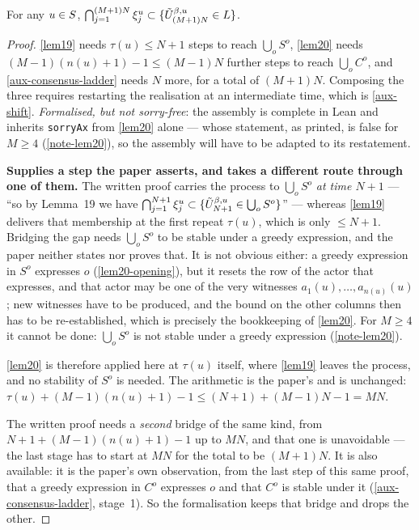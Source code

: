 \begin{proposition}
  \label{prop7}
  \leanok
  For any $u \in S$,
  $\bigcap_{j=1}^{(M+1)N} \xi_j^u \subset \{ \tilde{U}^{\beta,u}_{(M+1)N} \in L \}$.
\end{proposition}
\begin{proof}
  \leanok
  \ref{lem19} needs $\tau(u) \le N+1$ steps to reach $\bigcup_o S^o$,
  \ref{lem20} needs $(M-1)(n(u)+1)-1 \le (M-1)N$ further steps to reach
  $\bigcup_o C^o$, and \ref{aux-consensus-ladder} needs $N$ more, for a total
  of $(M+1)N$.  Composing the three requires restarting the realisation at an
  intermediate time, which is \ref{aux-shift}. \emph{Formalised, but not
  sorry-free}: the assembly is complete in Lean and inherits \texttt{sorryAx}
  from \ref{lem20} alone --- whose statement, as printed, is false for $M \ge
  4$ (\ref{note-lem20}), so the assembly will have to be adapted to its
  restatement.

  \textbf{Supplies a step the paper asserts, and takes a different route
  through one of them.} The written proof carries the process to $\bigcup_o
  S^o$ \emph{at time $N+1$} --- ``so by Lemma~19 we have
  $\bigcap_{j=1}^{N+1}\xi_j^u \subset \{\tilde{U}^{\beta,u}_{N+1} \in \bigcup_o S^o\}$''
  --- whereas \ref{lem19} delivers that membership at the first repeat
  $\tau(u)$, which is only $\le N+1$.  Bridging the gap needs $\bigcup_o S^o$
  to be stable under a greedy expression, and the paper neither states nor
  proves that.  It is not obvious either: a greedy expression in $S^o$
  expresses $o$ (\ref{lem20-opening}), but it resets the row of the actor that
  expresses, and that actor may be one of the very witnesses $a_1(u), \dots,
  a_{n(u)}(u)$; new witnesses have to be produced, and the bound on the other
  columns then has to be re-established, which is precisely the bookkeeping of
  \ref{lem20}.  For $M \ge 4$ it cannot be done: $\bigcup_o S^o$ is not stable
  under a greedy expression (\ref{note-lem20}).

  \ref{lem20} is therefore applied here at $\tau(u)$ itself, where \ref{lem19}
  leaves the process, and no stability of $S^o$ is needed.  The arithmetic is
  the paper's and is unchanged: $\tau(u) + (M-1)(n(u)+1) - 1 \le (N+1) + (M-1)N
  - 1 = MN$.

  The written proof needs a \emph{second} bridge of the same kind, from
  $N+1+(M-1)(n(u)+1)-1$ up to $MN$, and that one is unavoidable --- the last
  stage has to start at $MN$ for the total to be $(M+1)N$.  It is also
  available: it is the paper's own observation, from the last step of this same
  proof, that a greedy expression in $C^o$ expresses $o$ and that $C^o$ is
  stable under it (\ref{aux-consensus-ladder}, stage~1).  So the formalisation
  keeps that bridge and drops the other.
\end{proof}

